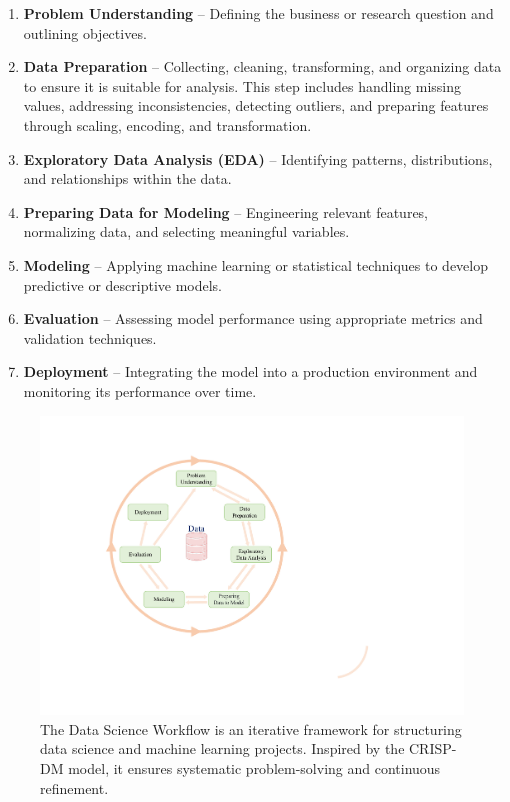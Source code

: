 \documentclass[
]{book}
\providecommand{\tightlist}{%
  \setlength{\itemsep}{0pt}\setlength{\parskip}{0pt}}
\theoremstyle{definition}
\theoremstyle{definition}
\theoremstyle{definition}
\theoremstyle{definition}
\theoremstyle{remark}
\begin{document}
\begin{enumerate}
\def\labelenumi{\arabic{enumi}.}
\tightlist
\item
  \textbf{Problem Understanding} -- Defining the business or research question and outlining objectives.\\
\item
  \textbf{Data Preparation} -- Collecting, cleaning, transforming, and organizing data to ensure it is suitable for analysis. This step includes handling missing values, addressing inconsistencies, detecting outliers, and preparing features through scaling, encoding, and transformation.\\
\item
  \textbf{Exploratory Data Analysis (EDA)} -- Identifying patterns, distributions, and relationships within the data.\\
\item
  \textbf{Preparing Data for Modeling} -- Engineering relevant features, normalizing data, and selecting meaningful variables.\\
\item
  \textbf{Modeling} -- Applying machine learning or statistical techniques to develop predictive or descriptive models.\\
\item
  \textbf{Evaluation} -- Assessing model performance using appropriate metrics and validation techniques.\\
\item
  \textbf{Deployment} -- Integrating the model into a production environment and monitoring its performance over time.
\end{enumerate}

\begin{figure}

{\centering \includegraphics[width=0.6\linewidth]{images/DSW} 

}

\caption{The Data Science Workflow is an iterative framework for structuring data science and machine learning projects. Inspired by the CRISP-DM model, it ensures systematic problem-solving and continuous refinement.}\label{fig:CRISP-DM}
\end{figure}
\end{document}
